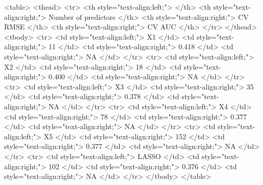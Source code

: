 <table>
 <thead>
  <tr>
   <th style="text-align:left;">   </th>
   <th style="text-align:right;"> Number of predictors </th>
   <th style="text-align:right;"> CV RMSE </th>
   <th style="text-align:right;"> CV AUC </th>
  </tr>
 </thead>
<tbody>
  <tr>
   <td style="text-align:left;"> X1 </td>
   <td style="text-align:right;"> 11 </td>
   <td style="text-align:right;"> 0.418 </td>
   <td style="text-align:right;"> NA </td>
  </tr>
  <tr>
   <td style="text-align:left;"> X2 </td>
   <td style="text-align:right;"> 18 </td>
   <td style="text-align:right;"> 0.400 </td>
   <td style="text-align:right;"> NA </td>
  </tr>
  <tr>
   <td style="text-align:left;"> X3 </td>
   <td style="text-align:right;"> 35 </td>
   <td style="text-align:right;"> 0.378 </td>
   <td style="text-align:right;"> NA </td>
  </tr>
  <tr>
   <td style="text-align:left;"> X4 </td>
   <td style="text-align:right;"> 78 </td>
   <td style="text-align:right;"> 0.377 </td>
   <td style="text-align:right;"> NA </td>
  </tr>
  <tr>
   <td style="text-align:left;"> X5 </td>
   <td style="text-align:right;"> 152 </td>
   <td style="text-align:right;"> 0.377 </td>
   <td style="text-align:right;"> NA </td>
  </tr>
  <tr>
   <td style="text-align:left;"> LASSO </td>
   <td style="text-align:right;"> 102 </td>
   <td style="text-align:right;"> 0.376 </td>
   <td style="text-align:right;"> NA </td>
  </tr>
</tbody>
</table>